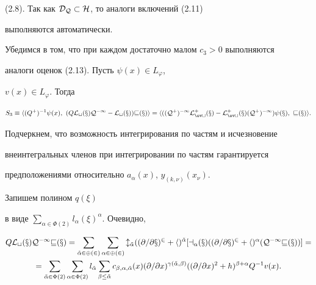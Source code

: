 \begin{pf}
(2.8). Так как $\cal D_Q\subset H$, то аналоги включений (2.11) 


выполняются автоматически. 


 


Убедимся в том, что при каждом достаточно малом $c_3>0$ выполняются 


аналоги оценок (2.13). Пусть $\psi(x)\in L_\varphi$, 


$v(x)\in L_\varphi$. Тогда 


$$ 


S_3\equiv\la(Q^+)^{-1}\psi(x),\ (Q\cal L_t(x)Q^{-1}- 


\cal L_t(x))v(x)\ra=\la((Q^+)^{-1}\cal L^+_{\ov t}(x)- 


\cal L^+_{\ov t}(x)(Q^+)^{-1})\psi(x),\ v(x)\ra. 


$$ 


Подчеркнем, что возможность интегрирования по частям и исчезновение  


внеинтегральных членов при интегрировании по частям гарантируется 


предположениями относительно $a_\alpha(x)$, $y_{(k,\nu)}(x_\nu)$. 


Запишем полином $q(\xi)$ 


в виде $\sum\limits_{\alpha\in\Phi(2)}l_\alpha(\xi)^\alpha$. Очевидно, 


\begin{multline*} 


Q\cal L_t(x)Q^{-1}v(x)= 


\sum_{\Tilde\alpha\in\Phi(2)} 


\sum_{\alpha\in\Phi(2)} 


l_{\Tilde\alpha}((\partial/\partial x)^2+h)^{\Tilde\alpha} 


[a_\alpha(x)((\partial/\partial x)^2+h)^\alpha 


(Q^{-1}v(x))]= \\ 


%


= \sum_{\Tilde\alpha\in\Phi(2)} 


\sum_{\alpha\in\Phi(2)}l_{\Tilde\alpha} 


\sum_{\beta\le\Tilde\alpha}c_{\beta,\alpha,\Tilde\alpha}(x) 


(\partial/\partial x)^{\gamma(\Tilde\alpha,\beta)} 


((\partial/\partial x)^2+h)^{\beta+\alpha} 


Q^{-1}v(x). 


\end{multline*} 



\end{pf}
